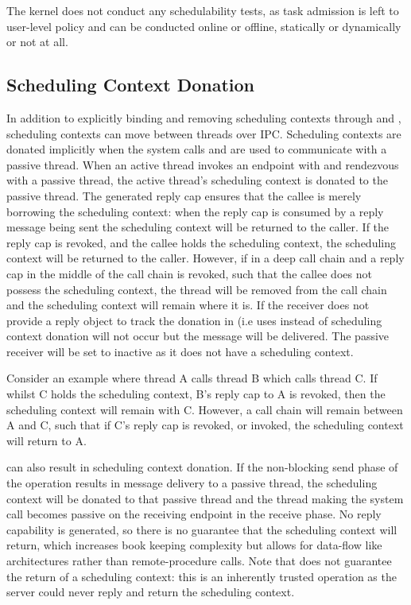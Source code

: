The kernel does not conduct any schedulability tests, as task admission is left to user-level policy
and can be conducted online or offline, statically or dynamically or not at all.

\subsection{Scheduling Context Donation}

In addition to explicitly binding and removing scheduling contexts through
 and
, scheduling contexts can move
between threads over IPC.  Scheduling contexts are donated implicitly when the system calls
 and  are used to
communicate with a passive thread.  When an active thread invokes an endpoint with
 and rendezvous with a passive thread, the active thread's scheduling
context is donated to the passive thread. The generated reply cap ensures that the callee is merely
borrowing the scheduling context: when the reply cap is consumed by a reply message being sent the
scheduling context will be returned to the caller.  If the reply cap is revoked, and the callee
holds the scheduling context, the scheduling context will be returned to the caller.  However, if in
a deep call chain and a reply cap in the middle of the call chain is revoked, such that the callee
does not possess the scheduling context, the thread will be removed from the call chain and the
scheduling context will remain where it is.  If the receiver does not provide a reply object to
track the donation in (i.e uses  instead of
 scheduling context donation will not occur but the message will be
delivered. The passive receiver will be set to inactive as it does not have a scheduling context.

Consider an example where thread A calls thread B which calls thread C.  If whilst C holds the
scheduling context, B's reply cap to A is revoked, then the scheduling context will remain with C.
However, a call chain will remain between A and C, such that if C's reply cap is revoked, or
invoked, the scheduling context will return to A.

 can also result in scheduling context donation.
If the non-blocking send phase of the operation results in message delivery to a passive thread, the
scheduling context will be donated to that passive thread and the thread making the system call becomes passive on the
receiving endpoint in the receive phase.  No reply capability is generated, so there
is no guarantee that the scheduling context will return, which increases book keeping complexity but allows
for data-flow like architectures rather than remote-procedure calls. Note that 
does not guarantee the return of a scheduling context: this is an inherently trusted operation as the
server could never reply and return the scheduling context.

